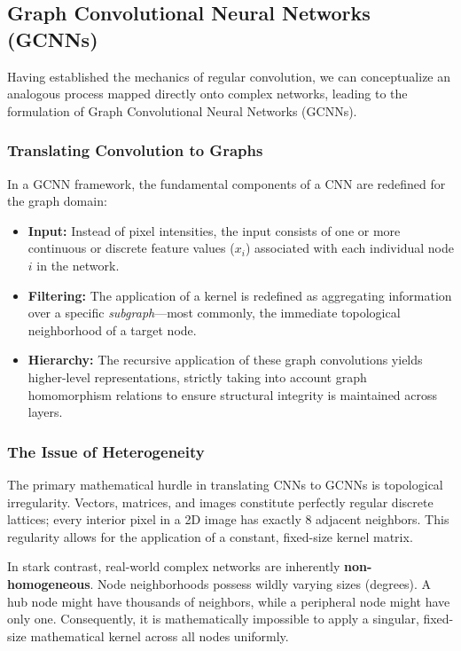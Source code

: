 \subsection{Graph Convolutional Neural Networks (GCNNs)}
\label{subsec:graph_convolutional_neural_networks}

Having established the mechanics of regular convolution, we can conceptualize an analogous process mapped directly onto complex networks, leading to the formulation of Graph Convolutional Neural Networks (GCNNs).

\subsubsection{Translating Convolution to Graphs}

In a GCNN framework, the fundamental components of a CNN are redefined for the graph domain:
\begin{itemize}
    \item \textbf{Input:} Instead of pixel intensities, the input consists of one or more continuous or discrete feature values ($x_i$) associated with each individual node $i$ in the network.
    \item \textbf{Filtering:} The application of a kernel is redefined as aggregating information over a specific \textit{subgraph}—most commonly, the immediate topological neighborhood of a target node.
    \item \textbf{Hierarchy:} The recursive application of these graph convolutions yields higher-level representations, strictly taking into account graph homomorphism relations to ensure structural integrity is maintained across layers.
\end{itemize}

\subsubsection{The Issue of Heterogeneity}

The primary mathematical hurdle in translating CNNs to GCNNs is topological irregularity. Vectors, matrices, and images constitute perfectly regular discrete lattices; every interior pixel in a 2D image has exactly 8 adjacent neighbors. This regularity allows for the application of a constant, fixed-size kernel matrix.

In stark contrast, real-world complex networks are inherently \textbf{non-homogeneous}. Node neighborhoods possess wildly varying sizes (degrees). A hub node might have thousands of neighbors, while a peripheral node might have only one. Consequently, it is mathematically impossible to apply a singular, fixed-size mathematical kernel across all nodes uniformly.

